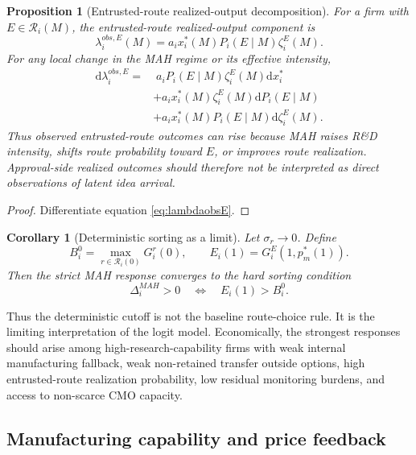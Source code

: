\documentclass[12pt]{article}
\newtheorem{proposition}{Proposition}
\newtheorem{corollary}{Corollary}
\newcommand{\1}{\mathbf{1}}
\newcommand{\dd}{\mathrm{d}}
\newcommand{\calR}{\mathcal{R}}
\begin{document}
\begin{proposition}[Entrusted-route realized-output decomposition]
\label{prop:observed_output_decomposition}
For a firm with $E\in\calR_i(M)$, the entrusted-route realized-output component is
\[
    \lambda_i^{obs,E}(M)
    =
    a_i x_i^*(M)P_i(E\mid M)\zeta_i^E(M).
\]
For any local change in the MAH regime or its effective intensity,
\begin{equation}
    \begin{aligned}
    \dd \lambda_i^{obs,E}
    =&\;
    a_i P_i(E\mid M)\zeta_i^E(M)\dd x_i^* \\
    &+
    a_i x_i^*(M)\zeta_i^E(M)\dd P_i(E\mid M) \\
    &+
    a_i x_i^*(M)P_i(E\mid M)\dd\zeta_i^E(M).
    \end{aligned}
    \label{eq:obsE_decomposition}
\end{equation}
Thus observed entrusted-route outcomes can rise because MAH raises R\&D intensity, shifts route probability toward $E$, or improves route realization. Approval-side realized outcomes should therefore not be interpreted as direct observations of latent idea arrival.
\end{proposition}

\begin{proof}
Differentiate equation \eqref{eq:lambdaobsE}.
\end{proof}

\begin{corollary}[Deterministic sorting as a limit]
\label{cor:deterministic_sorting_limit}
Let $\sigma_r\to0$. Define
\[
    B_i^0=\max_{r\in\calR_i(0)}G_i^r(0),
    \qquad
    E_i(1)=G_i^E(1,p_m^*(1)).
\]
Then the strict MAH response converges to the hard sorting condition
\begin{equation}
    \Delta_i^{MAH}>0
    \quad\Longleftrightarrow\quad
    E_i(1)>B_i^0.
    \label{eq:deterministic_sorting_limit}
\end{equation}
\end{corollary}

Thus the deterministic cutoff is not the baseline route-choice rule. It is the limiting interpretation of the logit model. Economically, the strongest responses should arise among high-research-capability firms with weak internal manufacturing fallback, weak non-retained transfer outside options, high entrusted-route realization probability, low residual monitoring burdens, and access to non-scarce CMO capacity.

\subsection{Manufacturing capability and price feedback}
\end{document}
